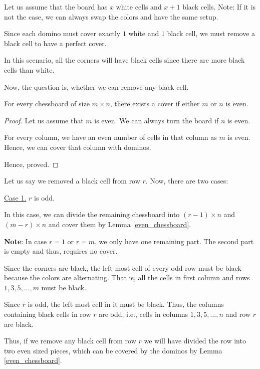 \begin{solution}[b]
  Let us assume that the board has $x$ white cells and $x+1$ black cells.
	Note: If it is not the case, we can always swap the colors and have the same setup.

	Since each domino must cover exactly $1$ white and $1$ black cell, we must remove a black cell to have a perfect cover.

	In this scenario, all the corners will have black cells since there are more black cells than white.

	Now, the question is, whether we can remove any black cell. 

	\begin{lemma}\label{even_chessboard}
		For every chessboard of size $m \times n$, there exists a cover if either $m$ or $n$ is even.
	\end{lemma}

	\begin{proof}
		Let us assume that $m$ is even. We can always turn the board if $n$ is even.

		For every column, we have an even number of cells in that column as $m$ is even. Hence, we can cover that column with dominos.

		Hence, proved.
	\end{proof}


	Let us say we removed a black cell from row $r$. Now, there are two cases:
	\bigbreak

	\underline{Case 1.} $r$ is odd.

	In this case, we can divide the remaining chessboard into $(r-1) \times n$ and $(m-r) \times n$ and cover them by Lemma \ref{even_chessboard}.
	
	\textbf{Note}: In case $r = 1$ or $r = m$, we only have one remaining part. The second part is empty and thus, requires no cover.
	
	Since the corners are black, the left most cell of every odd row must be black because the colors are alternating. That is, all the cells in first column and rows $1, 3, 5, ..., m$ must be black.

	Since $r$ is odd, the left most cell in it must be black.
	Thus, the columns containing black cells in row $r$ are odd, i.e., cells in columns $1, 3, 5, ..., n$ and row $r$ are black.

	Thus, if we remove any black cell from row $r$
	we will have divided the row into two even sized pieces, 
	which can be covered by the dominos by Lemma \ref{even_chessboard}.


\end{solution}
